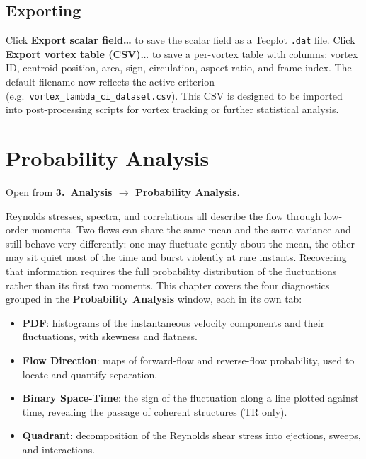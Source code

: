 \documentclass[11pt, a4paper]{report}
\newcommand{\uipth}[1]{\textbf{\textcolor{upblue}{#1}}}
\begin{document}
\section{Exporting}

Click \uipth{Export scalar field\ldots} to save the scalar field as a Tecplot \texttt{.dat} file. Click \uipth{Export vortex table (CSV)\ldots} to save a per-vortex table with columns: vortex ID, centroid position, area, sign, circulation, aspect ratio, and frame index. The default filename now reflects the active criterion (e.g.\ \texttt{vortex\_lambda\_ci\_dataset.csv}). This CSV is designed to be imported into post-processing scripts for vortex tracking or further statistical analysis.

\chapter{Probability Analysis}
\label{ch:probability}

Open from \uipth{3.\ Analysis $\to$ Probability Analysis}.

Reynolds stresses, spectra, and correlations all describe the flow through low-order moments. Two flows can share the same mean and the same variance and still behave very differently: one may fluctuate gently about the mean, the other may sit quiet most of the time and burst violently at rare instants. Recovering that information requires the full probability distribution of the fluctuations rather than its first two moments. This chapter covers the four diagnostics grouped in the \uipth{Probability Analysis} window, each in its own tab:

\begin{itemize}[leftmargin=1.5em]
  \item \textbf{PDF}: histograms of the instantaneous velocity components and their fluctuations, with skewness and flatness.
  \item \textbf{Flow Direction}: maps of forward-flow and reverse-flow probability, used to locate and quantify separation.
  \item \textbf{Binary Space-Time}: the sign of the fluctuation along a line plotted against time, revealing the passage of coherent structures (TR only).
  \item \textbf{Quadrant}: decomposition of the Reynolds shear stress into ejections, sweeps, and interactions.
\end{itemize}
\end{document}
